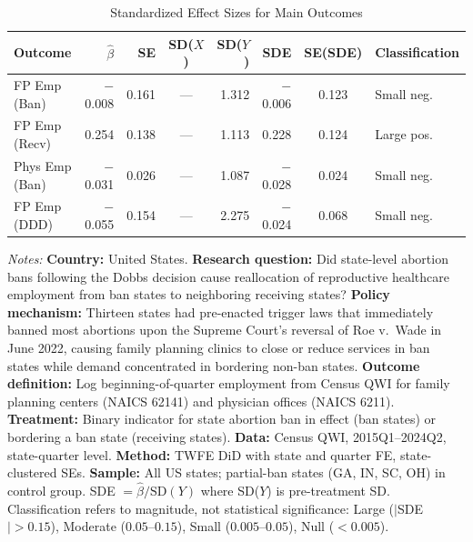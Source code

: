 \begin{table}[H]
\centering
\caption{Standardized Effect Sizes for Main Outcomes}
\label{tab:sde}
\small
\begin{threeparttable}
\begin{tabular}{@{}lrrcrrcl@{}}
\toprule
Outcome & $\hat{\beta}$ & SE & SD($X$) & SD($Y$) & SDE & SE(SDE) & Classification \\
\midrule
FP Emp (Ban) & $-$0.008 & 0.161 & --- & 1.312 & $-$0.006 & 0.123 & Small neg. \\
FP Emp (Recv) & 0.254 & 0.138 & --- & 1.113 & 0.228 & 0.124 & Large pos. \\
Phys Emp (Ban) & $-$0.031 & 0.026 & --- & 1.087 & $-$0.028 & 0.024 & Small neg. \\
FP Emp (DDD) & $-$0.055 & 0.154 & --- & 2.275 & $-$0.024 & 0.068 & Small neg. \\
\bottomrule
\end{tabular}
\begin{tablenotes}[flushleft]
\scriptsize
\item \textit{Notes:}
\textbf{Country:} United States.
\textbf{Research question:} Did state-level abortion bans following the Dobbs decision
cause reallocation of reproductive healthcare employment from ban states to neighboring
receiving states?
\textbf{Policy mechanism:} Thirteen states had pre-enacted trigger laws that immediately
banned most abortions upon the Supreme Court's reversal of Roe v.\ Wade in June 2022,
causing family planning clinics to close or reduce services in ban states while demand
concentrated in bordering non-ban states.
\textbf{Outcome definition:} Log beginning-of-quarter employment from Census QWI
for family planning centers (NAICS 62141) and physician offices (NAICS 6211).
\textbf{Treatment:} Binary indicator for state abortion ban in effect (ban states)
or bordering a ban state (receiving states).
\textbf{Data:} Census QWI, 2015Q1--2024Q2, state-quarter level.
\textbf{Method:} TWFE DiD with state and quarter FE, state-clustered SEs.
\textbf{Sample:} All US states; partial-ban states (GA, IN, SC, OH) in control group.
SDE $= \hat{\beta} / \text{SD}(Y)$ where SD($Y$) is pre-treatment SD.
Classification refers to magnitude, not statistical significance:
Large ($|$SDE$| > 0.15$), Moderate ($0.05$--$0.15$), Small ($0.005$--$0.05$),
Null ($< 0.005$).
\end{tablenotes}
\end{threeparttable}
\end{table}
